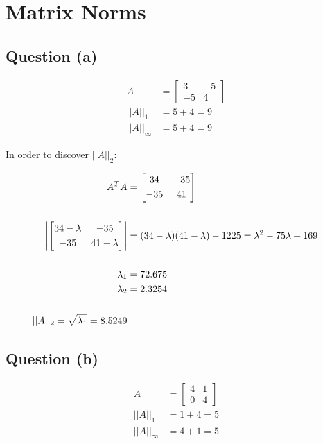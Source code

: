 \section{Matrix Norms}

	\subsection{Question (a)}
		\begin{align}
			A &= \begin{bmatrix}
					3 & -5 \\[0.3em]
					-5 & 4
				\end{bmatrix}& \\
			||A||_{1} &= 5 + 4 = 9& \\
			||A||_{\infty} &= 5 + 4 = 9&
		\label{eq:65a}
		\end{align}

		In order to discover $||A||_{2}$:

		\begin{align}
			A^{T}A &= \begin{bmatrix}
					34 & -35 \\[0.3em]
					-35 & 41
				\end{bmatrix}& \\
				\notag \\
			\left| \begin{bmatrix}
					34-\lambda & -35 \\[0.3em]
					-35 & 41-\lambda
				\end{bmatrix} \right| &=  (34-\lambda)(41-\lambda) - 1225 = \lambda^{2} - 75\lambda + 169& \\
				\notag \\
				\lambda_{1} &= 72.675& \\
				\lambda_{2} &= 2.3254& \\
				\notag \\
				||A||_{2} = \sqrt{\lambda_{1}} = 8.5249
		\label{eq:65aeigen}
		\end{align}

	\subsection{Question (b)}
		\begin{align}
			A &= \begin{bmatrix}
					4 & 1 \\[0.3em]
					0 & 4
				\end{bmatrix}& \\
			||A||_{1} &= 1 + 4 = 5& \\
			||A||_{\infty} &= 4 + 1 = 5&
		\label{eq:65b}
		\end{align}

